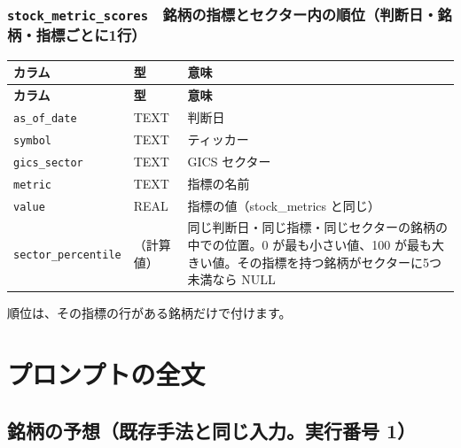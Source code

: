 \documentclass[xelatex,ja=standard,jafont=hiragino-pron,a4paper,10pt]{bxjsreport}
\begin{document}
\subsection*{\texttt{stock\_\allowbreak{}metric\_\allowbreak{}scores}　銘柄の指標とセクター内の順位（判断日・銘柄・指標ごとに1行）}
{\footnotesize
\begin{longtable}{p{3.60cm}p{1.80cm}p{8.90cm}}
\toprule
\textbf{カラム} & \textbf{型} & \textbf{意味} \\
\midrule
\endfirsthead
\toprule
\textbf{カラム} & \textbf{型} & \textbf{意味} \\
\midrule
\endhead
\bottomrule
\endfoot
\texttt{as\_\allowbreak{}of\_\allowbreak{}date} & TEXT & 判断日 \\
\texttt{symbol} & TEXT & ティッカー \\
\texttt{gics\_\allowbreak{}sector} & TEXT & GICS セクター \\
\texttt{metric} & TEXT & 指標の名前 \\
\texttt{value} & REAL & 指標の値（stock\_metrics と同じ） \\
\texttt{sector\_\allowbreak{}percentile} & （計算値） & 同じ判断日・同じ指標・同じセクターの銘柄の中での位置。0 が最も小さい値、100 が最も大きい値。その指標を持つ銘柄がセクターに5つ未満なら NULL \\
\end{longtable}
}
{\small 順位は、その指標の行がある銘柄だけで付けます。\par}
\medskip

\chapter{プロンプトの全文}\label{app:prompts}

\section{銘柄の予想（既存手法と同じ入力。実行番号 1）}
\end{document}
